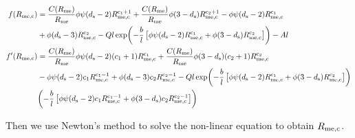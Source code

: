 \documentclass{article}
\begin{document}
\begin{itemize}
\begin{align}
  f(R_{\rm me,c}) &= \frac{C(R_{\rm me})}{R_{\rm me}} \phi \psi (d_{\rm s} -2) R_{\rm me,c}^{\rm c_1+1} + \frac{C(R_{\rm me})}{R_{\rm me}} \phi (3-d_{\rm s}) R_{\rm me,c}^{\rm c_2+1} - \phi \psi (d_{\rm s}-2) R_{\rm me,c}^{\rm c_1} \notag \\
  &+ \phi (d_{\rm s} -3) R_{\rm me,c}^{\rm c_2} - Q l \exp\biggl(- \frac{b}{l} \left[\phi \psi (d_{\rm s}-2) R_{\rm me,c}^{\rm c_1} + \phi (3-d_{\rm s}) R_{\rm me,c}^{\rm c_2}\right]\biggr) - A l \\
   f^ \prime (R_{\rm me,c}) &= \frac{C(R_{\rm me})}{R_{\rm me}} \phi \psi (d_{\rm s} -2) (c_1 +1) R_{\rm me,c}^{\rm c_1} + \frac{C(R_{\rm me})}{R_{\rm me}} \phi (3-d_{\rm s}) (c_2+1) R_{\rm me,c}^{\rm c_2} \notag \\
   &- \phi \psi (d_{\rm s}-2) c_1 R_{\rm me,c}^{\rm c_1-1} + \phi (d_{\rm s} -3) c_2 R_{\rm me,c}^{\rm c_2-1} \notag - Q l \exp\biggl(- \frac{b}{l} \left[\phi \psi (d_{\rm s}-2) R_{\rm me,c}^{\rm c_1} + \phi (3-d_{\rm s}) R_{\rm me,c}^{\rm c_2} \right]\biggr) \notag \\
   & \biggl(- \frac{b}{l} \left[\phi \psi (d_{\rm s}-2) c_1 R_{\rm me,c}^{\rm c_1-1} + \phi (3-d_{\rm s}) c_2 R_{\rm me,c}^{\rm c_2-1}\right]\biggr)
\end{align}

Then we use Newton's method to solve the non-linear equation to obtain $R_{\rm me,c}$.

\end{itemize}
\end{document}
